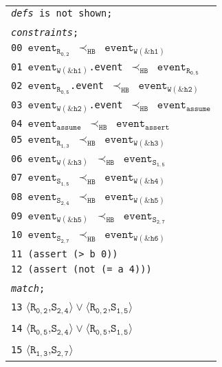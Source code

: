 \newsavebox{\boxSMTc}
\begin{lrbox}{\boxSMTc}
\normalsize
\begin{tabular}[t]{l}
\texttt{\textit{defs} is not shown;}\\
\\
\texttt{\textit{constraints};}\\
\texttt{00 $\mathtt{event_{R_{0,2}}}$ $\mathtt{\prec_{HB}}$ $\mathtt{event_{W(\&h1)}}$}\\
\texttt{01 $\mathtt{event_{W(\&h1)}}$.event $\mathtt{\prec_{HB}}$ $\mathtt{event_{R_{0,5}}}$}\\
\texttt{02 $\mathtt{event_{R_{0,5}}}$.event $\mathtt{\prec_{HB}}$ $\mathtt{event_{W(\&h2)}}$}\\
\texttt{03 $\mathtt{event_{W(\&h2)}}$.event $\mathtt{\prec_{HB}}$ $\mathtt{event_{assume}}$}\\
\texttt{04 $\mathtt{event_{assume}}$ $\mathtt{\prec_{HB}}$ $\mathtt{event_{assert}}$}\\
\texttt{05 $\mathtt{event_{R_{1,3}}}$ $\mathtt{\prec_{HB}}$ $\mathtt{event_{W(\&h3)}}$}\\
\texttt{06 $\mathtt{event_{W(\&h3)}}$ $\mathtt{\prec_{HB}}$ $\mathtt{event_{S_{1,5}}}$}\\
\texttt{07 $\mathtt{event_{S_{1,5}}}$ $\mathtt{\prec_{HB}}$ $\mathtt{event_{W(\&h4)}}$}\\
\texttt{08 $\mathtt{event_{S_{2,4}}}$ $\mathtt{\prec_{HB}}$ $\mathtt{event_{W(\&h5)}}$}\\
\texttt{09 $\mathtt{event_{W(\&h5)}}$ $\mathtt{\prec_{HB}}$ $\mathtt{event_{S_{2,7}}}$}\\
\texttt{10 $\mathtt{event_{S_{2,7}}}$ $\mathtt{\prec_{HB}}$ $\mathtt{event_{W(\&h6)}}$}\\
\texttt{11 (assert (> b 0))}\\
\texttt{12 (assert (not (= a 4)))}\\
\\
\texttt{\textit{match};}\\
\texttt{13} $\langle\mathtt{R_{0,2}}$,$\mathtt{S_{2,4}}\rangle\vee\langle\mathtt{R_{0,2}}$,$\mathtt{S_{1,5}}\rangle$\\
\texttt{14} $\langle\mathtt{R_{0,5}}$,$\mathtt{S_{2,4}}\rangle\vee\langle\mathtt{R_{0,5}}$,$\mathtt{S_{1,5}}\rangle$\\
\texttt{15} $\langle\mathtt{R_{1,3}}$,$\mathtt{S_{2,7}}\rangle$\\

\end{tabular}
\end{lrbox}

